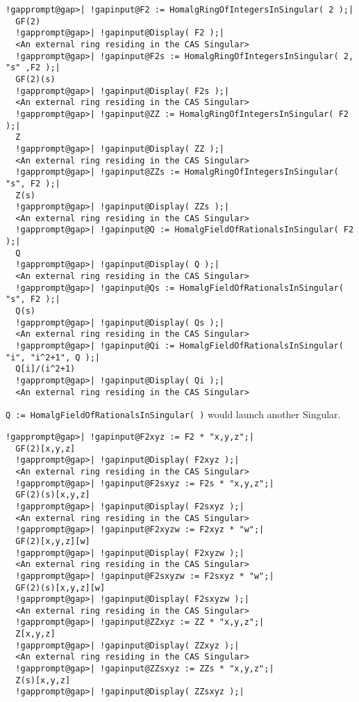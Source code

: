 \documentclass[a4paper,11pt]{report}
\begin{document}
{{{\begin{Verbatim}[commandchars=!@|,fontsize=\small,frame=single,label=Example]
  !gapprompt@gap>| !gapinput@F2 := HomalgRingOfIntegersInSingular( 2 );|
  GF(2)
  !gapprompt@gap>| !gapinput@Display( F2 );|
  <An external ring residing in the CAS Singular>
  !gapprompt@gap>| !gapinput@F2s := HomalgRingOfIntegersInSingular( 2, "s" ,F2 );|
  GF(2)(s)
  !gapprompt@gap>| !gapinput@Display( F2s );|
  <An external ring residing in the CAS Singular>
  !gapprompt@gap>| !gapinput@ZZ := HomalgRingOfIntegersInSingular( F2 );|
  Z
  !gapprompt@gap>| !gapinput@Display( ZZ );|
  <An external ring residing in the CAS Singular>
  !gapprompt@gap>| !gapinput@ZZs := HomalgRingOfIntegersInSingular( "s", F2 );|
  Z(s)
  !gapprompt@gap>| !gapinput@Display( ZZs );|
  <An external ring residing in the CAS Singular>
  !gapprompt@gap>| !gapinput@Q := HomalgFieldOfRationalsInSingular( F2 );|
  Q
  !gapprompt@gap>| !gapinput@Display( Q );|
  <An external ring residing in the CAS Singular>
  !gapprompt@gap>| !gapinput@Qs := HomalgFieldOfRationalsInSingular( "s", F2 );|
  Q(s)
  !gapprompt@gap>| !gapinput@Display( Qs );|
  <An external ring residing in the CAS Singular>
  !gapprompt@gap>| !gapinput@Qi := HomalgFieldOfRationalsInSingular( "i", "i^2+1", Q );|
  Q[i]/(i^2+1)
  !gapprompt@gap>| !gapinput@Display( Qi );|
  <An external ring residing in the CAS Singular>
\end{Verbatim}
 \texttt{Q := HomalgFieldOfRationalsInSingular( )} would launch another Singular. 
\begin{Verbatim}[commandchars=!@|,fontsize=\small,frame=single,label=Example]
  !gapprompt@gap>| !gapinput@F2xyz := F2 * "x,y,z";|
  GF(2)[x,y,z]
  !gapprompt@gap>| !gapinput@Display( F2xyz );|
  <An external ring residing in the CAS Singular>
  !gapprompt@gap>| !gapinput@F2sxyz := F2s * "x,y,z";|
  GF(2)(s)[x,y,z]
  !gapprompt@gap>| !gapinput@Display( F2sxyz );|
  <An external ring residing in the CAS Singular>
  !gapprompt@gap>| !gapinput@F2xyzw := F2xyz * "w";|
  GF(2)[x,y,z][w]
  !gapprompt@gap>| !gapinput@Display( F2xyzw );|
  <An external ring residing in the CAS Singular>
  !gapprompt@gap>| !gapinput@F2sxyzw := F2sxyz * "w";|
  GF(2)(s)[x,y,z][w]
  !gapprompt@gap>| !gapinput@Display( F2sxyzw );|
  <An external ring residing in the CAS Singular>
  !gapprompt@gap>| !gapinput@ZZxyz := ZZ * "x,y,z";|
  Z[x,y,z]
  !gapprompt@gap>| !gapinput@Display( ZZxyz );|
  <An external ring residing in the CAS Singular>
  !gapprompt@gap>| !gapinput@ZZsxyz := ZZs * "x,y,z";|
  Z(s)[x,y,z]
  !gapprompt@gap>| !gapinput@Display( ZZsxyz );|

\end{Verbatim}}}}
\end{document}
